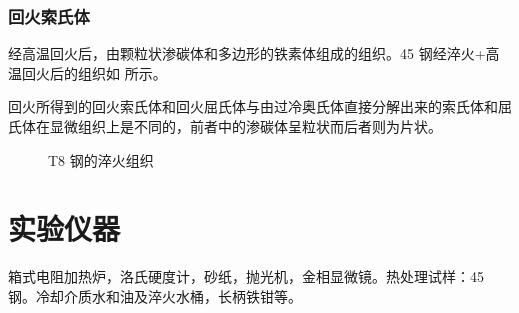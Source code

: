 \documentclass[a4paper,utf8]{article}
\begin{document}
            \subsubsection{回火索氏体}
                经高温回火后，由颗粒状渗碳体和多边形的铁素体组成的组织。45 钢经淬火+高温回火后的组织如 所示。\par
                回火所得到的回火索氏体和回火屈氏体与由过冷奥氏体直接分解出来的索氏体和屈氏体在显微组织上是不同的，前者中的渗碳体呈粒状而后者则为片状。
                \begin{figure}[!ht]
                    \centering
                    \hspace{20pt}
                    \hspace{20pt}
                    \caption{T8 钢的淬火组织\label{fig:3}}
                \end{figure}
\section{实验仪器}%
箱式电阻加热炉，洛氏硬度计，砂纸，抛光机，金相显微镜。热处理试样：45 钢。冷却介质水和油及淬火水桶，长柄铁钳等。
\end{document}
